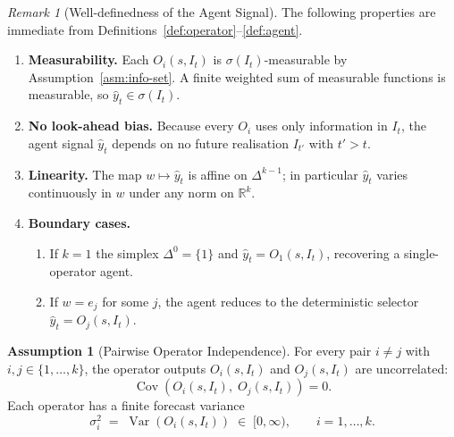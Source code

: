 \documentclass[12pt,openany]{book}
\newcommand{\R}{\mathbb{R}}
\newcommand{\calI}{\mathcal{I}}
\numberwithin{equation}{chapter}
\theoremstyle{plain}
\theoremstyle{definition}
\newtheorem{assumption}[theorem]{Assumption}
\theoremstyle{remark}
\newtheorem{remark}[theorem]{Remark}
\numberwithin{equation}{chapter}
\theoremstyle{plain}
\DeclareMathOperator{\Var}{Var}
\DeclareMathOperator{\Cov}{Cov}
\def\calI{I}%
\begin{document}
\begin{remark}[Well-definedness of the Agent Signal]
\label{rem:agent-welldef}
The following properties are immediate from
Definitions~\ref{def:operator}--\ref{def:agent}.
\begin{enumerate}
  \item \textbf{Measurability.}  Each $O_i(s,\calI_t)$ is
        $\sigma(\calI_t)$-measurable by
        Assumption~\ref{asm:info-set}.  A finite weighted sum of
        measurable functions is measurable, so $\hat{y}_t \in
        \sigma(\calI_t)$.

  \item \textbf{No look-ahead bias.}  Because every $O_i$ uses only
        information in $\calI_t$, the agent signal $\hat{y}_t$ depends
        on no future realisation $\calI_{t'}$ with $t' > t$.

  \item \textbf{Linearity.}  The map $w \mapsto \hat{y}_t$ is affine
        on $\Delta^{k-1}$; in particular $\hat{y}_t$ varies
        continuously in $w$ under any norm on $\R^k$.

  \item \textbf{Boundary cases.}
        \begin{enumerate}
          \item If $k = 1$ the simplex $\Delta^{0} = \{1\}$ and
                $\hat{y}_t = O_1(s,\calI_t)$, recovering a single-operator
                agent.
          \item If $w = e_j$ for some $j$, the agent reduces to the
                deterministic selector $\hat{y}_t = O_j(s,\calI_t)$.
        \end{enumerate}
\end{enumerate}
\end{remark}

\begin{assumption}[Pairwise Operator Independence]
\label{asm:pairwise-ind}
For every pair $i \neq j$ with $i,j \in \{1,\ldots,k\}$, the operator
outputs $O_i(s,\calI_t)$ and $O_j(s,\calI_t)$ are uncorrelated:
\begin{equation}
  \Cov\!\left(O_i(s,\calI_t),\;O_j(s,\calI_t)\right) = 0.
  \label{eq:pairwise-ind}
\end{equation}
Each operator has a finite forecast variance
\begin{equation}
  \sigma_i^2
    \;=\;
    \Var\!\left(O_i(s,\calI_t)\right)
    \;\in\; [0,\infty),
  \qquad i = 1,\ldots,k.
  \label{eq:op-variance}
\end{equation}
\end{assumption}
\end{document}
